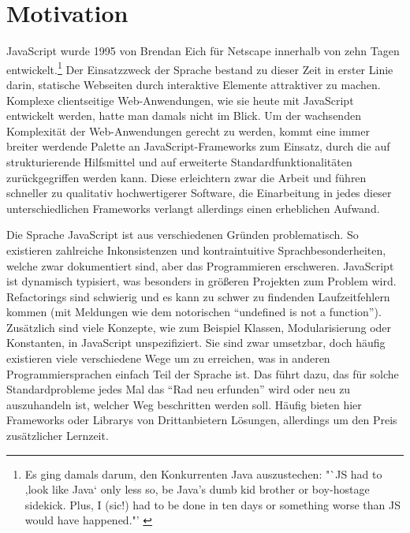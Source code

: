 \documentclass[a4paper, 12pt, hidelinks, listof=totoc, listoftables=totoc, bibliography=totoc]{scrreprt}
\begin{document}
\section{Motivation}

JavaScript wurde 1995 von Brendan Eich für Netscape innerhalb von zehn Tagen entwickelt.\footnote{Es ging damals darum, den Konkurrenten Java auszustechen: "`JS had to ,look like Java` only less so, be Java's dumb kid brother or boy-hostage sidekick. Plus, I (sic!) had to be done in ten days or something worse than JS would have happened."' \cite{eich2010.KBE}}  Der Einsatzzweck der Sprache bestand zu dieser Zeit in erster Linie darin, statische Webseiten durch interaktive Elemente attraktiver zu machen. Komplexe clientseitige Web-Anwendungen, wie sie heute mit JavaScript entwickelt werden, hatte man damals nicht im Blick. Um der wachsenden Komplexität der Web-Anwendungen gerecht zu werden, kommt eine immer breiter werdende Palette an JavaScript-Frameworks zum Einsatz, durch die auf strukturierende Hilfsmittel und auf erweiterte Standardfunktionalitäten zurückgegriffen werden kann. Diese erleichtern zwar die Arbeit und führen schneller zu qualitativ hochwertigerer Software, die Einarbeitung in jedes dieser unterschiedlichen Frameworks verlangt allerdings einen erheblichen Aufwand.

Die Sprache JavaScript ist aus verschiedenen Gründen problematisch. So existieren zahlreiche Inkonsistenzen und kontraintuitive Sprachbesonderheiten, welche zwar dokumentiert sind, aber das Programmieren erschweren. JavaScript ist dynamisch typisiert, was besonders in größeren Projekten zum Problem wird. Refactorings sind schwierig und es kann zu schwer zu findenden Laufzeitfehlern kommen (mit Meldungen wie dem notorischen "`undefined is not a function"'). Zusätzlich sind viele Konzepte, wie zum Beispiel Klassen, Modularisierung oder Konstanten, in JavaScript unspezifiziert. Sie sind zwar umsetzbar, doch häufig existieren viele verschiedene Wege um zu erreichen, was in anderen Programmiersprachen einfach Teil der Sprache ist. 
Das führt dazu, das für solche Standardprobleme jedes Mal das "`Rad neu erfunden"' wird oder neu zu auszuhandeln ist, welcher Weg beschritten werden soll. Häufig bieten hier Frameworks oder Librarys von Drittanbietern Lösungen, allerdings um den Preis zusätzlicher Lernzeit.

\end{document}
